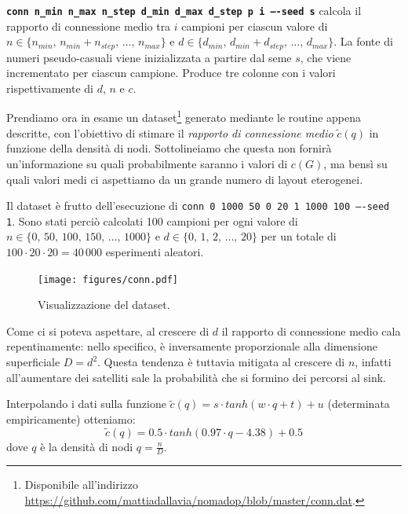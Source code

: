 \documentclass[a4paper,12pt]{article}
\theoremstyle{definition}
\begin{document}
\texttt{\textbf{conn n\_min n\_max n\_step d\_min d\_max d\_step p i ----seed s}} calcola il rapporto di connessione medio tra $i$ campioni per ciascun valore di $n \in \{n_{min},\,n_{min}+n_{step},\,\dots,\,n_{max}\}$ e $d \in \{d_{min},\,d_{min}+d_{step},\,\dots,\,d_{max}\}$. La fonte di numeri pseudo-casuali viene inizializzata a partire dal seme $s$, che viene incrementato per ciascun campione. Produce tre colonne con i valori rispettivamente di $d$, $n$ e $c$.


Prendiamo ora in esame un dataset\footnote{Disponibile all'indirizzo \url{https://github.com/mattiadallavia/nomadop/blob/master/conn.dat}.} generato mediante le routine appena descritte, con l'obiettivo di stimare il \emph{rapporto di connessione medio} $\tilde{c}(q)$ in funzione della densità di nodi. Sottolineiamo che questa non fornirà un'informazione su quali probabilmente saranno i valori di $c(G)$, ma bensì su quali valori medi ci aspettiamo da un grande numero di layout eterogenei.

Il dataset è frutto dell'esecuzione di \texttt{conn 0 1000 50 0 20 1 1000 100 ----seed 1}. Sono stati perciò calcolati 100 campioni per ogni valore di $n \in \{0,\,50,\,100,\,150,\,\dots,\,1000\}$ e $d \in \{0,\,1,\,2,\,\dots,\,20\}$ per un totale di $100 \cdot 20 \cdot 20 = 40\,000$ esperimenti aleatori.

\begin{figure}[H]
\centering
\texttt{[image: figures/conn.pdf]}
\caption{Visualizzazione del dataset.}
\end{figure}

Come ci si poteva aspettare, al crescere di $d$ il rapporto di connessione medio cala repentinamente: nello specifico, è inversamente proporzionale alla dimensione superficiale $D = d^2$. Questa tendenza è tuttavia mitigata al crescere di $n$, infatti all'aumentare dei satelliti sale la probabilità che si formino dei percorsi al sink.

Interpolando i dati sulla funzione $\tilde{c}(q) = s \cdot tanh(w \cdot q + t) + u$ (determinata empiricamente) otteniamo:
\begin{equation*}
\tilde{c}(q) = 0.5 \cdot tanh(0.97 \cdot q - 4.38) + 0.5
\end{equation*}
dove $q$ è la densità di nodi $q = \frac{n}{D}$.
\end{document}
